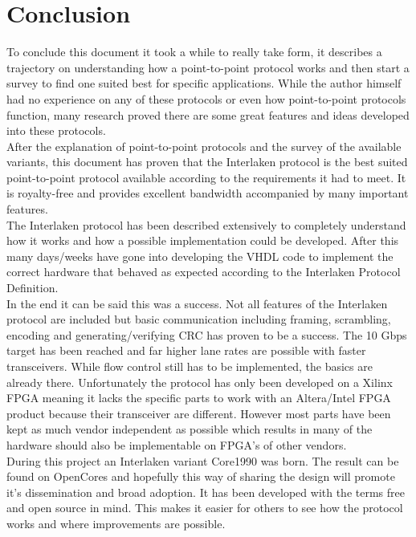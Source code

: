 \section{Conclusion}

To conclude this document it took a while to really take form, it describes a trajectory on understanding how a point-to-point protocol works and then start a survey to find one suited best for specific applications. While the author himself had no experience on any of these protocols or even how point-to-point protocols function, many research proved there are some great features and ideas developed into these protocols.\\

After the explanation of point-to-point protocols and the survey of the available variants, this document has proven that the Interlaken protocol is the best suited point-to-point protocol available according to the requirements it had to meet. It is royalty-free and provides excellent bandwidth accompanied by many important features.\\

The Interlaken protocol has been described extensively to completely understand how it works and how a possible implementation could be developed. After this many days/weeks have gone into developing the VHDL code to implement the correct hardware that behaved as expected according to the Interlaken Protocol Definition.\\

In the end it can be said this was a success. Not all features of the Interlaken protocol are included but basic communication including framing, scrambling, encoding and generating/verifying CRC has proven to be a success. The 10 Gbps target has been reached and far higher lane rates are possible with faster transceivers. While flow control still has to be implemented, the basics are already there. Unfortunately the protocol has only been developed on a Xilinx FPGA meaning it lacks the specific parts to work with an Altera/Intel FPGA product because their transceiver are different. However most parts have been kept as much vendor independent as possible which results in many of the hardware should also be implementable on FPGA's of other vendors.\\

During this project an Interlaken variant Core1990 was born. The result can be found on OpenCores and hopefully this way of sharing the design will promote it's dissemination and broad adoption. It has been developed with the terms free and open source in mind. This makes it easier for others to see how the protocol works and where improvements are possible.\\

